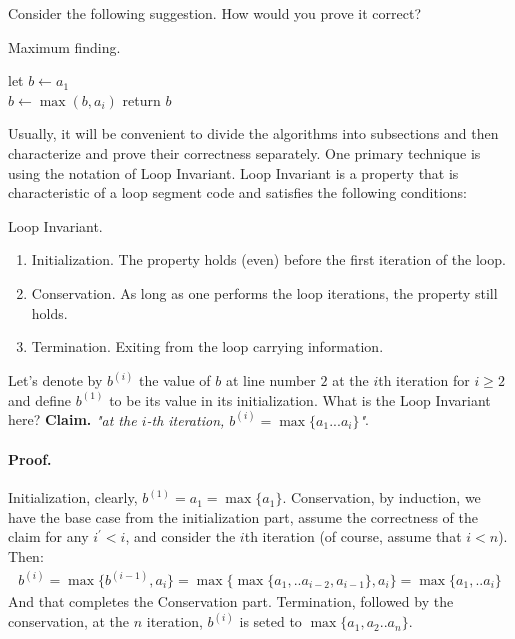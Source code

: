 Consider the following suggestion. How would you prove it correct?  
\begin{algbox}{Maximum finding.}
\begin{algorithm*}[H]
 let \(b \leftarrow a_1 \) \\ 
  { 
        \(b \leftarrow \max \left(b, a_i \right) \)
    } 
 return \( b \) 
\end{algorithm*}
\end{algbox}
Usually, it will be convenient to divide the algorithms into subsections and then characterize and prove their correctness separately. One primary technique is using the notation of Loop Invariant. Loop Invariant is a property that is characteristic of a loop segment code  and satisfies the following conditions:
\begin{defbox}{Loop Invariant.} 
\begin{enumerate}
  \item Initialization. The property holds (even) before the first iteration of the loop.    
    \item Conservation. As long as one performs the loop iterations, the property still holds.
    \item Termination. Exiting from the loop carrying information.
\end{enumerate}
\end{defbox}

Let's denote by $b^{(i)}$ the value of $b$ at line number $2$ at the $i$th iteration for $i\ge2$ and define $b^{(1)}$ to be its value in its initialization. What is the Loop Invariant here? \textbf{Claim.} \textit{"at the \(i\)-th iteration, $b^{(i)} = \max{ \{ a_1 ... a_{i} \} } $"}. 
\paragraph{Proof.} Initialization, clearly, $ b^{(1)} = a_{1} = \max{ \{ a_1 \} } $. Conservation, by induction, we have the base case from the initialization part, assume the correctness of the claim for any $i^\prime < i$, and consider the $i$th iteration (of course, assume that $i<n$). Then:  
\begin{equation*}
  \begin{split}
b^{(i)} = \max{ \{ b^{(i-1)}, a_{i} \} } = \max{ \{ \max{ \{ a_1, .. a_{i-2}, a_{i-1} \} }, a_{i} \} } = \max{ \{  a_{1}, .. a_{i} \} }
  \end{split}
\end{equation*} 
And that completes the Conservation part. Termination, followed by the conservation, at the $n$ iteration, $b^{(i)}$ is seted to $\max{ \{ a_1 ,a_2 .. a_n  \}}$. 

